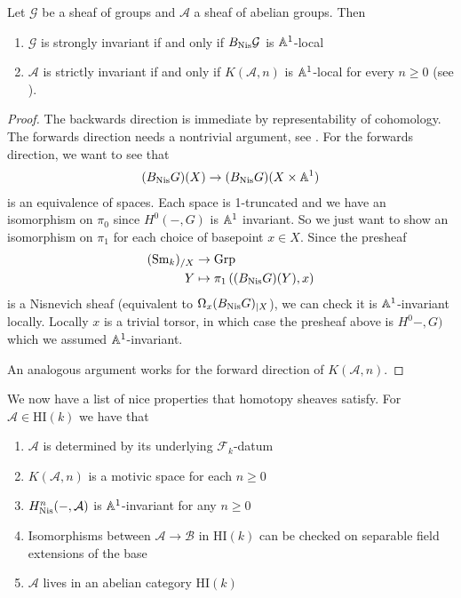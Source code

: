 \documentclass[11pt,openany]{book}
\providecommand{\HI}{\mathrm{HI}}
\begin{document}
\begin{proposition}\label{prop:strongly-strictly-redefined} 
Let $\mathcal{G}$ be a sheaf of groups and $\mathcal{A}$ a sheaf of abelian groups. Then
\begin{enumerate}
    \item $\mathcal{G}$ is strongly invariant if and only if $B_{\mathrm{Nis}} \mathcal{G}$ is $\mathbb{A}^1$-local
    \item $\mathcal{A}$ is strictly invariant if and only if $K(\mathcal{A},n)$ is $\mathbb{A}^1$-local for every $n\ge0$ (see \cite[6.2.2]{Morel-connectivity}).
\end{enumerate}
\end{proposition}
\begin{proof} The backwards direction is immediate by representability of cohomology. The forwards direction needs a nontrivial argument, see \cite[1.5]{bachmannstrongly}.
For the forwards direction, we want to see that
\begin{align*}
    (B_{\mathrm{Nis}} G)(X) \to (B_{\mathrm{Nis}} G)(X \times \mathbb{A}^1)
\end{align*}
is an equivalence of spaces. Each space is 1-truncated and we have an isomorphism on $\pi_0$ since $H^0(-,G)$ is $\mathbb{A}^1$ invariant. So we just want to show an isomorphism on $\pi_1$ for each choice of basepoint $x\in X$. Since the presheaf
\begin{align*}
    (\mathrm{Sm}_k)_{/X} &\to \mathrm{Grp}\\
    Y &\mapsto \pi_1 \left( (B_{\mathrm{Nis}} G)(Y), x \right)
\end{align*}
is a Nisnevich sheaf (equivalent to $\Omega_x (B_{\mathrm{Nis}} G)_{|X}$), we can check it is $\mathbb{A}^1$-invariant locally. Locally $x$ is a trivial torsor, in which case the presheaf above is $H^0-,G)$ which we assumed $\mathbb{A}^1$-invariant.

An analogous argument works for the forward direction of $K(\mathcal{A},n)$.
\end{proof}

We now have a list of nice properties that homotopy sheaves satisfy. For $\mathcal{A} \in \HI(k)$ we have that
\begin{enumerate}
    \item $\mathcal{A}$ is determined by its underlying $\mathcal{F}_k$-datum
    \item $K(\mathcal{A},n)$ is a motivic space for each $n\ge0$
    \item $H_{\mathrm{Nis}}^n(-,\mathcal{A})$ is $\mathbb{A}^1$-invariant for any $n\ge 0$
    \item Isomorphisms between $\mathcal{A} \to \mathcal{B}$ in $\HI(k)$ can be checked on separable field extensions of the base
    \item $\mathcal{A}$ lives in an abelian category $\HI(k)$
\end{enumerate}
\end{document}
